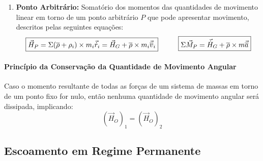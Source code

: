 \documentclass{article}
\begin{document}
\begin{enumerate}[rightmargin = \leftmargin]
                    \item \textbf{Ponto Arbitrário:} Somatório dos momentos das quantidades de movimento linear em torno de um ponto arbitrário $P$ que pode apresentar movimento, descritos pelas seguintes equações:
                        \begin{equation}
                            \boxed{
                                \vec{H}_{P} = 
                                \Sigma (\overline{\rho} + \rho_{i})\times m_{i}\vec{\dot{r}}_{i} = 
                                \vec{H}_{G} + \overline{\rho}\times m_{i}\vec{\overline{v}}_{i}
                            }
                            \hspace{10mm}
                            \boxed{
                                \Sigma \vec{M}_{P} = \vec{\dot{H}}_{G} + \overline{\rho}\times m \vec{\overline{a}}
                            }
                        \end{equation}
                \end{enumerate}

            \paragraph{Princípio da Conservação da Quantidade de Movimento Angular}Caso o momento resultante de todas as forças de um sistema de massas em torno de um ponto fixo for nulo, então nenhuma quantidade de movimento angular será dissipada, implicando:
                \begin{equation}
                    \boxed{
                        (\vec{H}_{O})_{1} = (\vec{H}_{O})_{2}
                    }
                \end{equation}

        \subsection{Escoamento em Regime Permanente}
\end{document}
